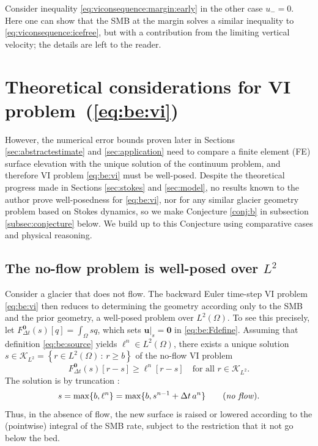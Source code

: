 \documentclass[hidelinks,onefignum,onetabnum,final]{siamart220329}  %
\newcommand{\bu}{\mathbf{u}}
\newcommand{\bzero}{\bm{0}}
\newcommand{\cK}{\mathcal{K}}
\begin{document}
Consider inequality \eqref{eq:viconsequence:margin:early} in the other case $u_-=0$.  Here one can show that the SMB at the margin solves a similar inequality to \eqref{eq:viconsequence:icefree}, but with a contribution from the limiting vertical velocity; the details are left to the reader.


\section{Theoretical considerations for VI problem~(\ref{eq:be:vi})} \label{sec:theory}

However, the numerical error bounds proven later in Sections \ref{sec:abstractestimate} and \ref{sec:application} need to compare a finite element (FE) surface elevation with the unique solution of the continuum problem, and therefore VI problem \eqref{eq:be:vi} must be well-posed.  Despite the theoretical progress made in Sections \ref{sec:stokes} and \ref{sec:model}, no results known to the author prove well-posedness for \eqref{eq:be:vi}, nor for any similar glacier geometry problem based on Stokes dynamics, so we make Conjecture \ref{conj:b} in subsection \ref{subsec:conjecture} below.  We build up to this Conjecture using comparative cases and physical reasoning.

\subsection{The no-flow problem is well-posed over $L^2$} \label{subsec:noflow}   Consider a glacier that does not flow.  The backward Euler time-step VI problem \eqref{eq:be:vi} then reduces to determining the geometry according only to the SMB and the prior geometry, a well-posed problem over $L^2(\Omega)$.  To see this precisely, let $F^{\bzero}_{\Delta t}(s)[q] = \int_\Omega sq$, which sets $\bu|_s=\bzero$ in \eqref{eq:be:Fdefine}.  Assuming that definition \eqref{eq:be:source} yields $\ell^n \in L^2(\Omega)$, there exists a unique solution $s \in \cK_{L^2} = \left\{r\in L^2(\Omega)\,:\,r \ge b\right\}$ of the no-flow VI problem
\begin{equation}
F^{\bzero}_{\Delta t}(s)[r-s] \ge \ell^n[r-s] \quad \text{for all } r \in \cK_{L^2}.
\end{equation}
The solution is by truncation \cite[section II.3]{KinderlehrerStampacchia1980}:
\begin{equation}
s = \max\{b, \ell^n\} = \max\{b, s^{n-1} + \Delta t\,a^n\} \qquad (\text{\emph{no flow}}).
\end{equation}
Thus, in the absence of flow, the new surface is raised or lowered according to the (pointwise) integral of the SMB rate, subject to the restriction that it not go below the bed.
\end{document}
